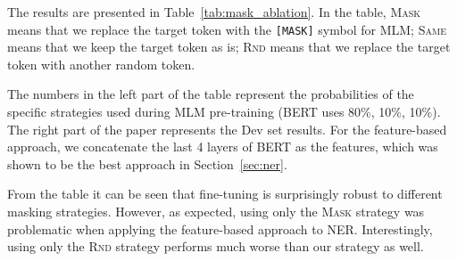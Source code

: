 

The results are presented in Table~\ref{tab:mask_ablation}. In the table,
 \textsc{Mask} means that we replace the target token with the {\tt [MASK]} symbol
for MLM; \textsc{Same} means that we keep the target token as is; \textsc{Rnd}
means that we replace the target token with another random token. 

The numbers in the left part of the table represent the probabilities of the specific strategies used during MLM pre-training (BERT uses 80\%, 10\%, 10\%). The right part of the paper represents the Dev set results. For the feature-based
approach, we concatenate the last 4 layers of BERT as the features, which
was shown to be the best approach in Section~\ref{sec:ner}.

From the table it can be seen that fine-tuning is surprisingly robust to
different masking strategies. However, as expected, using only the \textsc{Mask} strategy
was problematic when applying the feature-based approach to NER. Interestingly,
using only the \textsc{Rnd} strategy performs much worse than our strategy as well.






